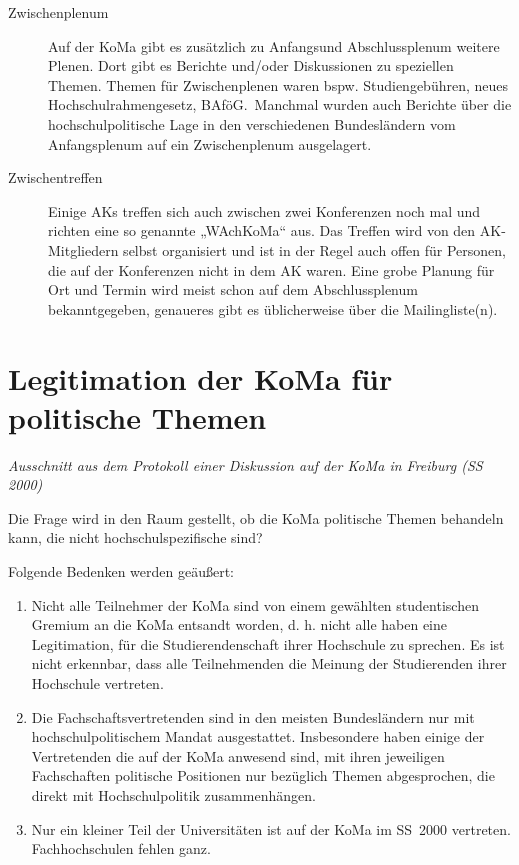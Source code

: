 \documentclass{neulingsheft}
\begin{document}
{\begin{description}
\item[Zwischenplenum] Auf der KoMa gibt es zusätzlich zu Anfangsund
	Abschlussplenum weitere Plenen. Dort gibt es Berichte und/oder Diskussionen
	zu speziellen Themen. Themen für Zwischenplenen waren bspw.
	Studiengebühren, neues Hochschulrahmengesetz, BAföG.\ Manchmal wurden auch
	Berichte über die hochschulpolitische Lage in den verschiedenen
	Bundesländern vom Anfangsplenum auf ein Zwischenplenum ausgelagert.

\item[Zwischentreffen] Einige AKs treffen sich auch zwischen zwei Konferenzen
	noch mal und richten eine so genannte „WAchKoMa“ aus. Das Treffen wird von
	den AK-Mitgliedern selbst organisiert und ist in der Regel auch offen für
	Personen, die auf der Konferenzen nicht in dem AK waren.  Eine grobe
	Planung für Ort und Termin wird meist schon auf dem Abschlussplenum
	bekanntgegeben, genaueres gibt es üblicherweise über die Mailingliste(n).
\end{description}

\chapter{Legitimation der KoMa für politische Themen}

\emph{Ausschnitt aus dem Protokoll einer Diskussion auf der KoMa in Freiburg
(SS 2000)}

Die Frage wird in den Raum gestellt, ob die KoMa politische Themen behandeln
kann, die nicht hochschulspezifische sind?

Folgende Bedenken werden geäußert:
\begin{enumerate}
\item Nicht alle Teilnehmer der KoMa sind von einem gewählten studentischen
	Gremium an die KoMa entsandt worden, d. h.  nicht alle haben eine
	Legitimation, für die Studierendenschaft ihrer Hochschule zu sprechen.  Es
	ist nicht erkennbar, dass alle Teilnehmenden die Meinung der Studierenden
	ihrer Hochschule vertreten.
\item Die Fachschaftsvertretenden sind in den meisten Bundesländern nur mit
	hochschulpolitischem Mandat ausgestattet.  Insbesondere haben einige der
	Vertretenden die auf der KoMa anwesend sind, mit ihren jeweiligen
	Fachschaften politische Positionen nur bezüglich Themen abgesprochen, die
	direkt mit Hochschulpolitik zusammenhängen.
\item Nur ein kleiner Teil der Universitäten ist auf der KoMa im SS~2000
	vertreten. Fachhochschulen fehlen ganz.
\end{enumerate}

}
\end{document}
